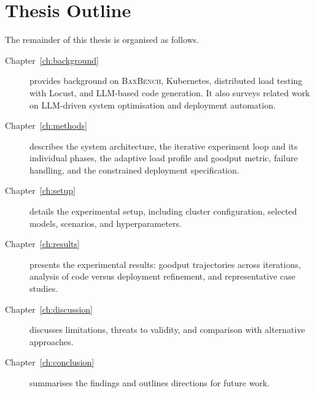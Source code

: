 \section{Thesis Outline}
\label{sec:intro-outline}

The remainder of this thesis is organised as follows.
%
\begin{description}
  \item[Chapter~\ref{ch:background}] provides background on
    \textsc{BaxBench}, Kubernetes, distributed load testing with Locust, and
    LLM-based code generation.  It also surveys related work on LLM-driven
    system optimisation and deployment automation.

  \item[Chapter~\ref{ch:methods}] describes the system architecture, the
    iterative experiment loop and its individual phases, the adaptive load
    profile and goodput metric, failure handling, and the constrained
    deployment specification.

  \item[Chapter~\ref{ch:setup}] details the experimental setup, including
    cluster configuration, selected models, scenarios, and hyperparameters.

  \item[Chapter~\ref{ch:results}] presents the experimental results: goodput
    trajectories across iterations, analysis of code versus deployment
    refinement, and representative case studies.

  \item[Chapter~\ref{ch:discussion}] discusses limitations, threats to
    validity, and comparison with alternative approaches.

  \item[Chapter~\ref{ch:conclusion}] summarises the findings and outlines
    directions for future work.
\end{description}
